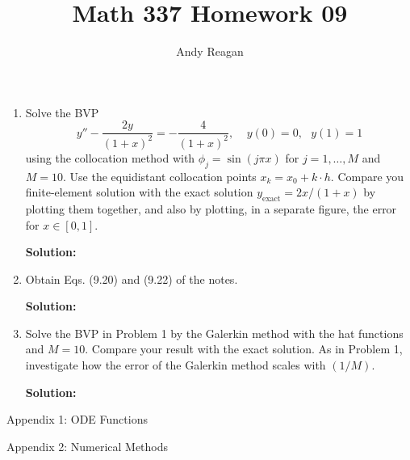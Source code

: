 \documentclass[11pt]{article}
\author{Andy Reagan}
\title{Math 337 Homework 09}
\def\f{\frac }
\begin{document}
\maketitle

\begin{enumerate}

\item Solve the BVP
\[ y'' - \f{2y}{(1+x)^2} = -\f{4}{(1+x)^2}, ~~~~~y(0)=0,~~~y(1) = 1\]
using the collocation method with $\phi _j = \sin (j\pi x)$ for $j = 1,\ldots,M$ and $M=10$.
Use the equidistant collocation points $x_k = x_0 + k\cdot h$.
Compare you finite-element solution with the exact solution $y_{\text{exact}} = 2x/(1+x)$ by plotting them together, and also by plotting, in a separate figure, the error for $x\in [0,1]$.

\bigskip
\textbf{Solution:} 

\item Obtain Eqs. (9.20) and (9.22) of the notes.

\bigskip
\textbf{Solution:} 

\item Solve the BVP in Problem 1 by the Galerkin method with the hat functions and $M=10$.
Compare your result with the exact solution.
As in Problem 1, investigate how the error of the Galerkin method scales with $(1/M)$.

\bigskip
\textbf{Solution:} 

\end{enumerate}

\clearpage
\pagebreak
{\huge Appendix 1: ODE Functions}

\clearpage
\pagebreak
{\huge Appendix 2: Numerical Methods}

\end{document}
